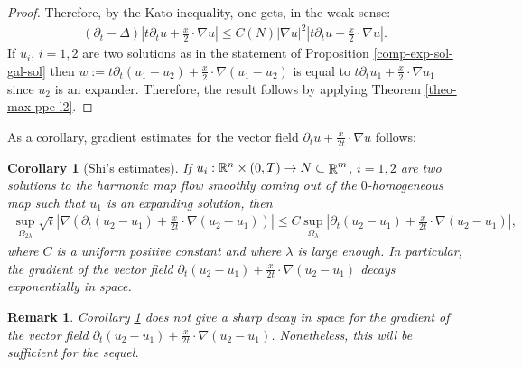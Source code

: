 \documentclass[a4paper,11pt,reqno]{amsart}
\newtheorem{coro}[defn]{Corollary}
\newtheorem{rk}[defn]{Remark}
\def\R{\mathop{\rm \mathbb{R}}\nolimits}
\begin{document}
\begin{proof}
 Therefore, by the Kato inequality, one gets, in the weak sense:
\begin{eqnarray*}
(\partial_t-\Delta)\left|t\partial_tu+\frac{x}{2}\cdot\nabla u\right|\leq C(N) |\nabla u|^2\left|t\partial_tu+\frac{x}{2}\cdot\nabla u\right|
.
\end{eqnarray*}
If $u_i$, $i=1,2$ are two solutions as in the statement of Proposition \ref{comp-exp-sol-gal-sol} then $w:=t\partial_t(u_1-u_2)+\frac{x}{2}\cdot\nabla (u_1-u_2)$ is equal to $t\partial_tu_1+\frac{x}{2}\cdot\nabla u_1$ since $u_2$ is an expander. Therefore, the result follows by applying Theorem \ref{theo-max-ppe-l2}.

\end{proof}
As a corollary, gradient estimates for the vector field $\partial_tu+\frac{x}{2t}\cdot\nabla u$ follows:

\begin{coro}[Shi's estimates]\label{coro-shi-est-grad-obst-tensor}
If $u_i:\mathbb{R}^n\times(0,T)\rightarrow N\subset \R^m$, $i=1,2$ are two solutions to the harmonic map flow smoothly coming out of the $0$-homogeneous map such that $u_1$ is an expanding solution, then
\begin{eqnarray*}
\sup_{\Omega_{2\lambda}}\sqrt{t}\left|\nabla\left(\partial_t(u_2-u_1)+\frac{x}{2t}\cdot\nabla (u_2-u_1)\right)\right|\leq C \sup_{\Omega_{\lambda}}\left|\partial_t(u_2-u_1)+\frac{x}{2t}\cdot\nabla (u_2-u_1)\right|,
\end{eqnarray*}
where $C$ is a uniform positive constant and where $\lambda$ is large enough. In particular, the gradient of the vector field $\partial_t(u_2-u_1)+\frac{x}{2t}\cdot\nabla (u_2-u_1)$ decays exponentially in space.

\end{coro}
\begin{rk}
Corollary \ref{coro-shi-est-grad-obst-tensor} does not give a sharp decay in space for the gradient of the vector field $\partial_t(u_2-u_1)+\frac{x}{2t}\cdot\nabla (u_2-u_1)$. Nonetheless, this will be sufficient for the sequel.
\end{rk}
\end{document}
